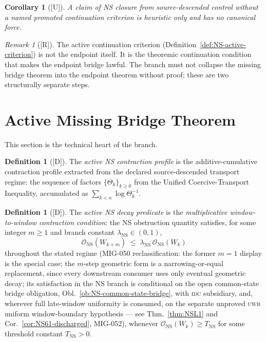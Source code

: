 \documentclass[12pt,oneside]{amsbook}
\theoremstyle{plain}
\newtheorem{corollary}[theorem]{Corollary}
\theoremstyle{definition}
\newtheorem{definition}[theorem]{Definition}
\theoremstyle{remark}
\newtheorem{remark}[theorem]{Remark}
\newcommand{\status}[1]{\textup{[#1]}}
\begin{document}
\begin{corollary}[\status{U}]\label{cor:NS-no-unnamed-criterion}
A claim of NS closure from source-descended control without a
named promoted continuation criterion is heuristic only and has
no canonical force.
\end{corollary}

\begin{remark}[\status{R}]\label{rmk:NS-criterion-intermediate}
The active continuation criterion
(Definition~\ref{def:NS-active-criterion}) is not the endpoint
itself. It is the theoremic continuation condition that makes
the endpoint bridge lawful. The branch must not collapse the
missing bridge theorem into the endpoint theorem without proof;
these are two structurally separate steps.
\end{remark}

\section{Active Missing Bridge Theorem}

This section is the technical heart of the branch.

\begin{definition}[\status{D}]\label{def:NS-contraction-profile}
The \emph{active NS contraction profile} is the
additive-cumulative contraction profile extracted from the
declared source-descended transport regime: the sequence of
factors $\{\Theta_k\}_{k \geq 0}$ from the Unified
Coercive-Transport Inequality, accumulated as
$\sum_{k < n} \log \Theta_k^{-1}$.
\end{definition}

\begin{definition}[\status{D}]\label{def:NS-decay-predicate}
The \emph{active NS decay predicate} is the
\emph{multiplicative window-to-window contraction condition}:
the NS obstruction quantity satisfies, for some integer
$m \geq 1$ and branch constant
$\lambda_{\mathrm{NS}} \in (0,1)$,
\[
 \mathcal{O}_{\mathrm{NS}}(W_{k+m})
 \;\leq\;
 \lambda_{\mathrm{NS}}\,\mathcal{O}_{\mathrm{NS}}(W_k)
\]
throughout the stated regime (MIG-050 reclassification: the former
$m=1$ display is the special case; the $m$-step geometric form is a
narrowing-or-equal replacement, since every downstream consumer uses
only eventual geometric decay; its satisfaction in the NS branch is
conditional on the open common-state bridge obligation,
Obl.~\ref{ob:NS-common-state-bridge}, with \textsc{idc} subsidiary,
and, wherever full late-window uniformity is consumed, on the
separate unproved \textsc{uwb} uniform window-boundary hypothesis
--- see Thm.~\ref{thm:NSL1} and
Cor.~\ref{cor:NS61-discharged}, MIG-052), whenever
$\mathcal{O}_{\mathrm{NS}}(W_k) \geq T_{\mathrm{NS}}$ for
some threshold constant $T_{\mathrm{NS}} > 0$.
\end{definition}
\end{document}
